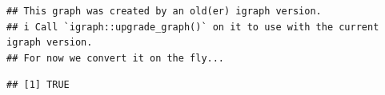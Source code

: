 \documentclass[
]{book}
\newenvironment{Shaded}{\begin{snugshade}}{\end{snugshade}}
\newcommand{\CommentTok}[1]{\textcolor[rgb]{0.56,0.35,0.01}{\textit{#1}}}
\newcommand{\FunctionTok}[1]{\textcolor[rgb]{0.13,0.29,0.53}{\textbf{#1}}}
\newcommand{\NormalTok}[1]{#1}
\newcommand{\SpecialCharTok}[1]{\textcolor[rgb]{0.81,0.36,0.00}{\textbf{#1}}}
\begin{document}
\begin{verbatim}
## This graph was created by an old(er) igraph version.
## i Call `igraph::upgrade_graph()` on it to use with the current igraph version.
## For now we convert it on the fly...
\end{verbatim}

\begin{Shaded}
\end{Shaded}

\begin{verbatim}
## [1] TRUE
\end{verbatim}
\end{document}
